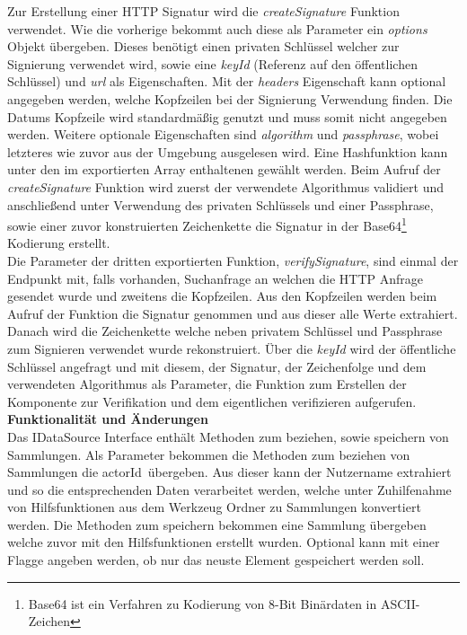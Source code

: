 Zur Erstellung einer HTTP Signatur wird die \textit{createSignature} Funktion verwendet. Wie die vorherige bekommt auch diese als Parameter ein \textit{options} Objekt übergeben. Dieses benötigt einen privaten Schlüssel welcher zur Signierung verwendet wird, sowie eine \textit{keyId} (Referenz auf den öffentlichen Schlüssel) und \textit{url} als Eigenschaften. Mit der \textit{headers} Eigenschaft kann optional angegeben werden, welche Kopfzeilen bei der Signierung Verwendung finden. Die Datums Kopfzeile wird standardmäßig genutzt und muss somit nicht angegeben werden. Weitere optionale Eigenschaften sind \textit{algorithm} und \textit{passphrase}, wobei letzteres wie zuvor aus der Umgebung ausgelesen wird. Eine Hashfunktion kann unter den im exportierten Array enthaltenen gewählt werden. Beim Aufruf der \textit{createSignature} Funktion wird zuerst der verwendete Algorithmus validiert und anschließend unter Verwendung des privaten Schlüssels und einer Passphrase, sowie einer zuvor konstruierten Zeichenkette die Signatur in der Base64\footnote{Base64 ist ein Verfahren zu Kodierung von 8-Bit Binärdaten in ASCII-Zeichen} Kodierung erstellt.\\

Die Parameter der dritten exportierten Funktion, \textit{verifySignature}, sind einmal der Endpunkt mit, falls vorhanden, Suchanfrage an welchen die HTTP Anfrage gesendet wurde und zweitens die Kopfzeilen. Aus den Kopfzeilen werden beim Aufruf der Funktion die Signatur genommen und aus dieser alle Werte extrahiert. Danach wird die Zeichenkette welche neben privatem Schlüssel und Passphrase zum Signieren verwendet wurde rekonstruiert. Über die \textit{keyId} wird der öffentliche Schlüssel angefragt und mit diesem, der Signatur, der Zeichenfolge und dem verwendeten Algorithmus als Parameter, die Funktion zum Erstellen der Komponente zur Verifikation und dem eigentlichen verifizieren aufgerufen.\\

\begingroup
	\fontsize{18pt}{12pt}\selectfont
	\textbf{Funktionalität und Änderungen}
	\vspace{4pt}
\endgroup\\
Das IDataSource Interface enthält Methoden zum beziehen, sowie speichern von Sammlungen. Als Parameter bekommen die Methoden zum beziehen von Sammlungen die \glqq actorId\grqq~übergeben. Aus dieser kann der Nutzername extrahiert und so die entsprechenden Daten verarbeitet werden, welche unter Zuhilfenahme von Hilfsfunktionen aus dem Werkzeug Ordner zu Sammlungen konvertiert werden. Die Methoden zum speichern bekommen eine Sammlung übergeben welche zuvor mit den Hilfsfunktionen erstellt wurden. Optional kann mit einer Flagge angeben werden, ob nur das neuste Element gespeichert werden soll.\\

